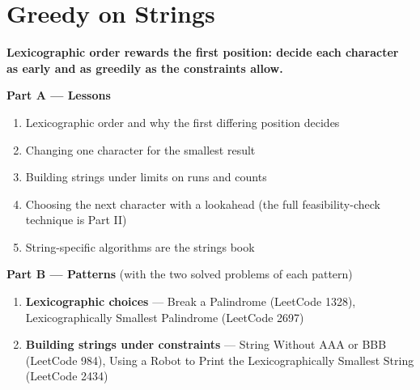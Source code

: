 \chapter{Greedy on Strings}
\label{ch:strings}

\begin{tcolorbox}[enhanced, colback=white, colframe=secondaryblue, boxrule=1pt, arc=2mm]
\textbf{\large\textcolor{primaryblue}{Lexicographic order rewards the first position: decide each character as early and as greedily as the constraints allow.}}
\end{tcolorbox}


\begin{plannedbox}
\textbf{Part A --- Lessons}
\begin{enumerate}[leftmargin=*, label=\textbf{A\arabic*.}, itemsep=1pt]
    \item Lexicographic order and why the first differing position decides
    \item Changing one character for the smallest result
    \item Building strings under limits on runs and counts
    \item Choosing the next character with a lookahead (the full feasibility-check technique is Part II)
    \item String-specific algorithms are the strings book
\end{enumerate}
\textbf{Part B --- Patterns} (with the two solved problems of each pattern)
\begin{enumerate}[leftmargin=*, label=\textbf{P\arabic*.}, itemsep=1pt]
    \item \textbf{Lexicographic choices} --- Break a Palindrome {\small\color{darkgray}(LeetCode 1328)}, Lexicographically Smallest Palindrome {\small\color{darkgray}(LeetCode 2697)}
    \item \textbf{Building strings under constraints} --- String Without AAA or BBB {\small\color{darkgray}(LeetCode 984)}, Using a Robot to Print the Lexicographically Smallest String {\small\color{darkgray}(LeetCode 2434)}
\end{enumerate}
\end{plannedbox}
